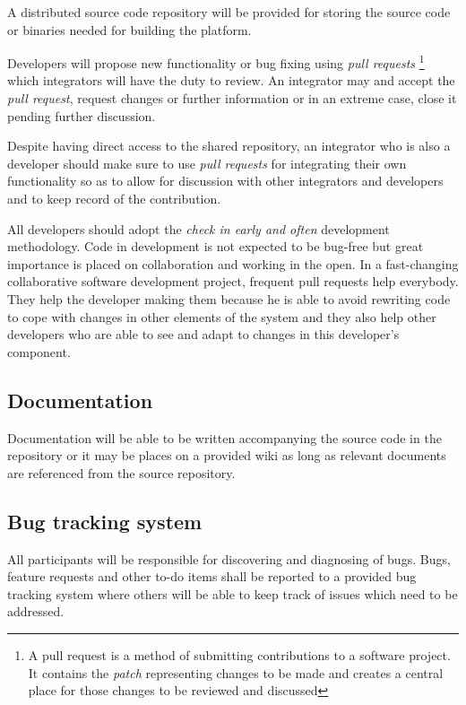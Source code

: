 A distributed source code repository will be provided for storing the source code or binaries
needed for building the \learnpad platform.

Developers will propose new functionality or bug fixing using \emph{pull requests}
\footnote{A pull request is a method of submitting contributions to a software project.
It contains the \emph{patch} representing changes to be made and creates a central place
for those changes to be reviewed and discussed}
which integrators will have the duty to review. An integrator may and accept the
\emph{pull request}, request changes or further information or in an extreme case,
close it pending further discussion.

Despite having direct access to the shared repository, an integrator who is also a developer should
make sure to use \emph{pull requests} for integrating their own functionality so as to allow for
discussion with other integrators and developers and to keep record of the contribution.

All developers should adopt the \emph{check in early and often} development methodology.
Code in development is not expected to be bug-free but great importance is placed on collaboration
and working in the open. In a fast-changing collaborative software development project, frequent
pull requests help everybody. They help the developer making them because he is able to avoid
rewriting code to cope with changes in other elements of the system and they also help other
developers who are able to see and adapt to changes in this developer's component.

\subsection{Documentation}
\label{sec:documentation}

Documentation will be able to be written accompanying the source code in the repository or it
may be places on a provided wiki as long as relevant documents are referenced from the source
repository.

\subsection{Bug tracking system}
\label{sec:bug tracking-system}

All participants will be responsible for discovering and diagnosing of bugs. Bugs, feature
requests and other to-do items shall be reported to a provided bug tracking system where others
will be able to keep track of issues which need to be addressed.

